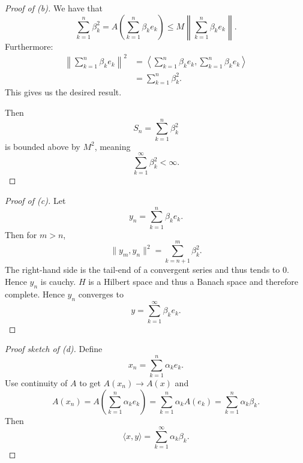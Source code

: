 \begin{proof}[Proof of (b)]
    We have that 
    \[
        \sum_{k=1}^n \beta_k^2 = 
        A\left(\sum_{k=1}^n \beta_k e_k \right)
        \leq 
        M \left\|\sum_{k=1}^n \beta_k e_k\right\|.
    \]
    Furthermore: 
    \begin{align*}
        \left\|\sum_{k=1}^n\beta_k e_k\right\|^2 
        &= 
        \left\langle 
        \sum_{k=1}^n \beta_k e_k, 
        \sum_{k=1}^n \beta_k e_k 
        \right\rangle \\ 
        &= \sum_{k=1}^n \beta_k^2.  
    \end{align*}
    This gives us the desired result. 

    Then 
    \[
        S_n = \sum_{k=1}^n \beta_k^2 
    \]
    is bounded above by $M^2$, meaning 
    \[
        \sum_{k=1}^\infty \beta_k^2 < \infty.
    \]
\end{proof}
\begin{proof}[Proof of (c)]
    Let 
    \[
        y_n = \sum_{k=1}^n \beta_ke_k. 
    \]
    Then for $m > n$, 
    \[
        \|y_m, y_n\|^2 = \sum_{k=n+1}^m \beta_k^2. 
    \]
    The right-hand side is the tail-end of a convergent series 
    and thus tends to $0$. Hence $y_n$ is cauchy. $H$ is 
    a Hilbert space and thus a Banach space and therefore complete. 
    Hence $y_n$ converges to 
    \[
        y = \sum_{k=1}^\infty \beta_k e_k.
    \]
\end{proof}
\begin{proof}[Proof sketch of (d)]
    Define 
    \[
        x_n=\sum_{k=1}^n \alpha_k e_k.
    \]
    Use continuity of $A$ to get $A(x_n)\to A(x)$ and 
    \[
        A(x_n)
        =
        A\left(\sum_{k=1}^n \alpha_k e_k\right)
        =
        \sum_{k=1}^n\alpha_k A(e_k)
        =
        \sum_{k=1}^n\alpha_k\beta_k.
    \]
    Then 
    \[
        \langle x,y\rangle
        =
        \sum_{k=1}^\infty \alpha_k\beta_k.
    \]
\end{proof}

